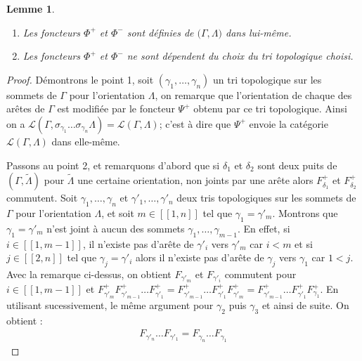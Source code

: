 \documentclass[a4paper,10pt]{article}
\newtheorem{lm}[thm]{Lemme}%
\begin{document}
\begin{lm}
\label{lem2}
  \begin{enumerate}
  \item Les foncteurs $\Phi^{+}$ et $\Phi^{-}$ sont définies de $\mathscr(\Gamma, \Lambda)$ dans lui-même.
  \item Les foncteurs $\Phi^{+}$ et $\Phi^{-}$ ne sont dépendent du choix du tri topologique choisi.
  \end{enumerate}
\end{lm}
\begin{proof}
  Démontrons le point 1, soit $(\gamma_{1}, \dots, \gamma_{n})$ un tri topologique sur les sommets de $\Gamma$ pour l'orientation $\Lambda$, on remarque que l'orientation de chaque des arêtes de $\Gamma$ est modifiée par le foncteur $\Psi^{+}$ obtenu par ce tri topologique. Ainsi on a $\mathscr L(\Gamma,\sigma_{\gamma_{1}} \dots \sigma_{\gamma_{n}}\Lambda) = \mathscr L(\Gamma,\Lambda)$; c'est à dire que $\Psi^{+}$ envoie la catégorie $\mathscr L(\Gamma,\Lambda)$ dans elle-même.

  Passons au point 2, et remarquons d'abord que si $\delta_{1}$ et $\delta_{2}$ sont deux puits de $(\Gamma,\widetilde \Lambda)$ pour $\widetilde \Lambda$ une certaine orientation, non joints par une arête alors $F^{+}_{\delta_{1}}$ et $F^{+}_{\delta_{2}}$ commutent. 
Soit $\gamma_{1}, \dots, \gamma_{n}$ et $\gamma'_{1}, \dots , \gamma'_{n}$ deux tris topologiques sur les sommets de $\Gamma$ pour l'orientation $\Lambda$, et soit $m \in [\![1,n]\!]$ tel que $\gamma_{1}= \gamma'_{m}$. Montrons que $\gamma_{1} = \gamma'_{m}$ n'est joint à aucun des sommets $\gamma_{1},\dots, \gamma_{m-1}$. En effet, si $i \in [\![1,m-1]\!]$, il n'existe pas d'arête de $\gamma'_{i}$ vers $\gamma'_{m}$ car $i<m$ et si $j \in [\![2,n]\!]$ tel que $\gamma_{j} = \gamma'_{i}$ alors il n'existe pas d'arête de $\gamma_{j}$ vers $\gamma_{1}$ car $1<j$. Avec la remarque ci-dessus, on obtient $F_{\gamma'_{m}}$ et $F_{\gamma'_{i}}$ commutent pour $i \in [\![1,m-1]\!]$ et $F^{+}_{\gamma'_{m}}F^{+}_{\gamma'_{m-1}}\dots F^{+}_{\gamma'_{1}} = F^{+}_{\gamma'_{m-1}}\dots F^{+}_{\gamma'_{1}} F^{+}_{\gamma'_{m}} = F^{+}_{\gamma'_{m-1}}\dots F^{+}_{\gamma'_{1}}F^{+}_{\gamma_{1}}$. En utilisant sucessivement, le même argument pour $\gamma_{2}$ puis $\gamma_{3}$ et ainsi de suite. On obtient : 
\begin{eqnarray}%
  F_{\gamma'_{n}}\dots F_{\gamma'_{1}} = F_{\gamma_{n}} \dots F_{\gamma_{1}}
\end{eqnarray}
\end{proof}
\end{document}
